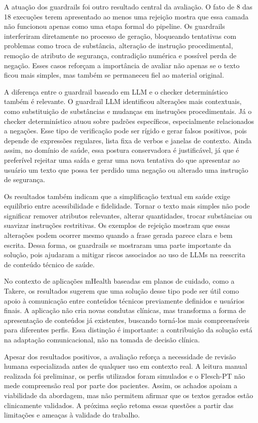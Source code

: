 A atuação dos guardrails foi outro resultado central da avaliação. O fato de 8 das 18 execuções terem apresentado ao menos uma rejeição mostra que essa camada não funcionou apenas como uma etapa formal do pipeline. Os guardrails interferiram diretamente no processo de geração, bloqueando tentativas com problemas como troca de substância, alteração de instrução procedimental, remoção de atributo de segurança, contradição numérica e possível perda de negação. Esses casos reforçam a importância de avaliar não apenas se o texto ficou mais simples, mas também se permaneceu fiel ao material original.

A diferença entre o guardrail baseado em LLM e o checker determinístico também é relevante. O guardrail LLM identificou alterações mais contextuais, como substituição de substâncias e mudanças em instruções procedimentais. Já o checker determinístico atuou sobre padrões específicos, especialmente relacionados a negações. Esse tipo de verificação pode ser rígido e gerar falsos positivos, pois depende de expressões regulares, lista fixa de verbos e janelas de contexto. Ainda assim, no domínio de saúde, essa postura conservadora é justificável, já que é preferível rejeitar uma saída e gerar uma nova tentativa do que apresentar ao usuário um texto que possa ter perdido uma negação ou alterado uma instrução de segurança.

Os resultados também indicam que a simplificação textual em saúde exige equilíbrio entre acessibilidade e fidelidade. Tornar o texto mais simples não pode significar remover atributos relevantes, alterar quantidades, trocar substâncias ou suavizar instruções restritivas. Os exemplos de rejeição mostram que essas alterações podem ocorrer mesmo quando a frase gerada parece clara e bem escrita. Dessa forma, os guardrails se mostraram uma parte importante da solução, pois ajudaram a mitigar riscos associados ao uso de LLMs na reescrita de conteúdo técnico de saúde.

No contexto de aplicações mHealth baseadas em planos de cuidado, como a Takere, os resultados sugerem que uma solução desse tipo pode ser útil como apoio à comunicação entre conteúdos técnicos previamente definidos e usuários finais. A aplicação não cria novas condutas clínicas, mas transforma a forma de apresentação de conteúdos já existentes, buscando torná-los mais compreensíveis para diferentes perfis. Essa distinção é importante: a contribuição da solução está na adaptação comunicacional, não na tomada de decisão clínica.

Apesar dos resultados positivos, a avaliação reforça a necessidade de revisão humana especializada antes de qualquer uso em contexto real. A leitura manual realizada foi preliminar, os perfis utilizados foram simulados e o Flesch-PT não mede compreensão real por parte dos pacientes. Assim, os achados apoiam a viabilidade da abordagem, mas não permitem afirmar que os textos gerados estão clinicamente validados. A próxima seção retoma essas questões a partir das limitações e ameaças à validade do trabalho.
